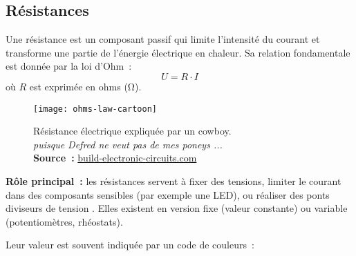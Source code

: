 \subsection{R\'esistances} \label{subsec:resistors}
Une r\'esistance est un composant passif qui limite l'intensit\'e du courant et transforme une partie de l'\'energie \'electrique en chaleur. Sa relation fondamentale est donn\'ee par la loi d'Ohm~:
\[
U = R \cdot I
\]
où \(R\) est exprim\'ee en ohms (\unit{\ohm}).
\begin{figure}[H]
    \centering
    \texttt{[image: ohms-law-cartoon]}
    \caption{
        \centering
        R\'esistance \'electrique expliqu\'ee par un cowboy. \\\emph{puisque Defred ne veut pas de mes poneys ...}\\
        \textbf{Source~:}
        \href{https://build-electronic-circuits.com/ohms-law}{build-electronic-circuits.com}
    }
\end{figure}
\textbf{Rôle principal~:} les r\'esistances servent à fixer des tensions, limiter le courant dans des composants sensibles (par exemple une LED), ou r\'ealiser des ponts diviseurs de tension . Elles existent en version fixe (valeur constante) ou variable (potentiom\`etres, rh\'eostats).\par
Leur valeur est souvent indiqu\'ee par un code de couleurs~:
